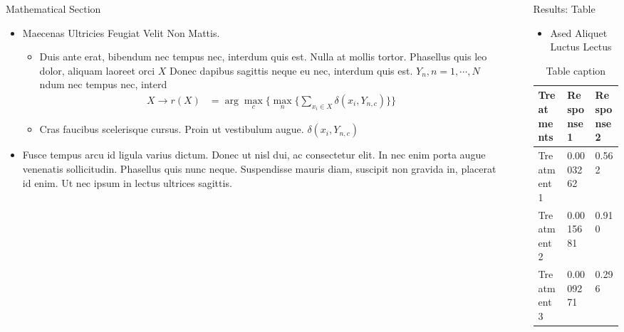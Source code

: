 \documentclass[final,hyperref={pdfpagelabels=false}]{beamer}
\begin{document}
\begin{frame}[t]
\begin{columns}[t]
\begin{column}{.465\textwidth}
\begin{block}{Mathematical Section}
\begin{itemize}
\item Maecenas Ultricies Feugiat Velit Non Mattis.
\begin{itemize}
\item Duis ante erat, bibendum nec tempus nec, interdum quis est. Nulla at mollis tortor. Phasellus quis leo dolor, aliquam laoreet orci $X$ Donec dapibus sagittis neque eu nec, interdum quis est. $Y_n, n=1,\cdots,N$ ndum nec tempus nec, interd
\begin{align*}
X \rightarrow r(X) & = \arg \max_{c} \Big\{ \max_n \big\{ \sum_{x_i \in X} \delta(x_i,Y_{n,c})\big\} \Big\} 
\end{align*}
\item Cras faucibus scelerisque cursus. Proin ut vestibulum augue. $\delta(x_i,Y_{n,c})$
\end{itemize}
\item Fusce tempus arcu id ligula varius dictum. Donec ut nisl dui, ac consectetur elit. In nec enim porta augue venenatis sollicitudin. Phasellus quis nunc neque. Suspendisse mauris diam, suscipit non gravida in, placerat id enim. Ut nec ipsum in lectus ultrices sagittis.
\end{itemize}

\end{block}


\end{column} %

\begin{column}{.03\textwidth}\end{column} %
 
\begin{column}{.465\textwidth} %


\begin{block}{Results: Table}

\begin{itemize}
\item Ased Aliquet Luctus Lectus
\end{itemize}

\begin{table}
\begin{tabular}{l l l}
\toprule
\textbf{Treatments} & \textbf{Response 1} & \textbf{Response 2}\\
\midrule
Treatment 1 & 0.0003262 & 0.562 \\
Treatment 2 & 0.0015681 & 0.910 \\
Treatment 3 & 0.0009271 & 0.296 \\
\bottomrule
\end{tabular}
\caption{Table caption}
\end{table}


\end{block}
\end{column}
\end{columns}
\end{frame}
\end{document}
